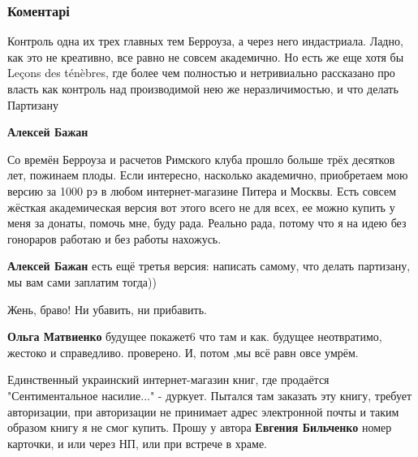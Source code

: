  
 
 
 
 
\subsubsection{Коментарі}

\begin{itemize} %

Контроль одна их трех главных тем Берроуза, а через него индастриала. Ладно,
как это не креативно, все равно не совсем академично. Но есть же еще хотя бы
Leçons des ténèbres, где более чем полностью и нетривиально рассказано про
власть как контроль над производимой нею же неразличимостью,
и что делать Партизану

\begin{itemize} %
\textbf{Алексей Бажан} 

Со времён Берроуза и расчетов Римского клуба прошло больше трёх десятков лет,
пожинаем плоды. Если интересно, насколько академично, приобретаем мою версию за
1000 рэ в любом интернет-магазине Питера и Москвы. Есть совсем жёсткая
академическая версия вот этого всего не для всех, ее можно купить у меня за
донаты, помочь мне, буду рада. Реально рада, потому что я на идею без гонораров
работаю и без работы нахожусь.

\textbf{Алексей Бажан} есть ещё третья версия: написать самому, что делать партизану, мы вам сами заплатим тогда))
\end{itemize} %

Жень, браво! Ни убавить, ни прибавить.

\begin{itemize} %
\textbf{Ольга Матвиенко} будущее покажет6 что там и как. будущее неотвратимо, жестоко и справедливо. проверено. И, потом ,мы всё равн овсе умрём.
\end{itemize} %


Единственный украинский интернет-магазин книг, где продаётся "Сентиментальное
насилие..." - дуркует. Пытался там заказать эту книгу, требует авторизации, при
авторизации не принимает адрес электронной почты и таким образом книгу я не
смог купить. Прошу у автора \textbf{Евгения Бильченко} номер карточки, и или через НП,
или при встрече в храме.


\end{itemize}
